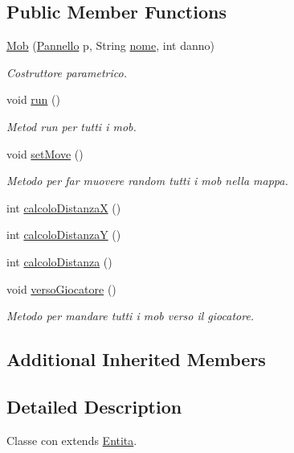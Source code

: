 \subsection*{Public Member Functions}
\begin{DoxyCompactItemize}
\item 
\hyperlink{class_entita_1_1_mob_aafddf7ad4fdd9baf8fd7b6f269b99ed3}{Mob} (\hyperlink{classa_1_1survival_1_1game_1_1_pannello}{Pannello} p, String \hyperlink{class_entita_1_1_entita_a4cfff30ec02286864b995e013b6c2a41}{nome}, int danno)
\begin{DoxyCompactList}\small\item\em Costruttore parametrico. \end{DoxyCompactList}\item 
void \hyperlink{class_entita_1_1_mob_a13a43e6d814de94978c515cb084873b1}{run} ()
\begin{DoxyCompactList}\small\item\em Metod run per tutti i mob. \end{DoxyCompactList}\item 
void \hyperlink{class_entita_1_1_mob_a447f807a76b7ea97a78cb76241fe8bc8}{set\+Move} ()
\begin{DoxyCompactList}\small\item\em Metodo per far muovere random tutti i mob nella mappa. \end{DoxyCompactList}\item 
int \hyperlink{class_entita_1_1_mob_a4f271dd5929f9fe1eab650a5b4f08ad1}{calcolo\+DistanzaX} ()
\item 
int \hyperlink{class_entita_1_1_mob_a852bb2aeaf4c181e950c7a81b5d06c32}{calcolo\+DistanzaY} ()
\item 
int \hyperlink{class_entita_1_1_mob_a5b3253014bb1313413c75c8e18fc5f08}{calcolo\+Distanza} ()
\item 
void \hyperlink{class_entita_1_1_mob_a52258fe2687e7c05d4c65a1f4714b0c5}{verso\+Giocatore} ()
\begin{DoxyCompactList}\small\item\em Metodo per mandare tutti i mob verso il giocatore. \end{DoxyCompactList}\end{DoxyCompactItemize}
\subsection*{Additional Inherited Members}


\subsection{Detailed Description}
Classe con extends \hyperlink{class_entita_1_1_entita}{Entita}. 

